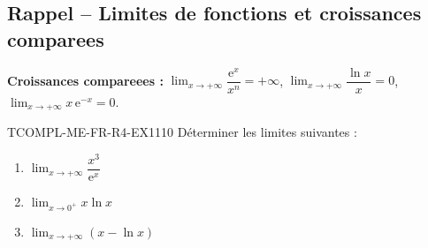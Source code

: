 

\subsection*{Rappel -- Limites de fonctions et croissances comparees}

\textbf{Croissances compareees :} $\lim_{x \to +\infty} \dfrac{\mathrm{e}^x}{x^n} = +\infty$, $\lim_{x \to +\infty} \dfrac{\ln x}{x} = 0$, $\lim_{x \to +\infty} x\,\mathrm{e}^{-x} = 0$.

\begin{exercice}{TCOMPL-ME-FR-R4-EX1}{1}{10}
Déterminer les limites suivantes :
\begin{enumerate}
  \item $\lim_{x \to +\infty} \dfrac{x^3}{\mathrm{e}^x}$
  \item $\lim_{x \to 0^+} x \ln x$
  \item $\lim_{x \to +\infty} \left(x - \ln x\right)$
\end{enumerate}
\end{exercice}

